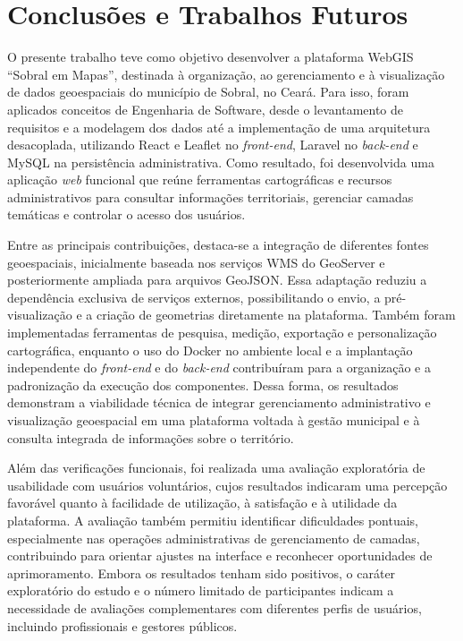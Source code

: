 
\chapter{Conclusões e Trabalhos Futuros}
\label{chap:conclusoes-e-trabalhos-futuros}

O presente trabalho teve como objetivo desenvolver a plataforma WebGIS ``Sobral em Mapas'', destinada à organização, ao gerenciamento e à visualização de dados geoespaciais do município de Sobral, no Ceará. Para isso, foram aplicados conceitos de Engenharia de Software, desde o levantamento de requisitos e a modelagem dos dados até a implementação de uma arquitetura desacoplada, utilizando React e Leaflet no \textit{front-end}, Laravel no \textit{back-end} e MySQL na persistência administrativa. Como resultado, foi desenvolvida uma aplicação \textit{web} funcional que reúne ferramentas cartográficas e recursos administrativos para consultar informações territoriais, gerenciar camadas temáticas e controlar o acesso dos usuários.

Entre as principais contribuições, destaca-se a integração de diferentes fontes geoespaciais, inicialmente baseada nos serviços WMS do GeoServer e posteriormente ampliada para arquivos GeoJSON. Essa adaptação reduziu a dependência exclusiva de serviços externos, possibilitando o envio, a pré-visualização e a criação de geometrias diretamente na plataforma. Também foram implementadas ferramentas de pesquisa, medição, exportação e personalização cartográfica, enquanto o uso do Docker no ambiente local e a implantação independente do \textit{front-end} e do \textit{back-end} contribuíram para a organização e a padronização da execução dos componentes. Dessa forma, os resultados demonstram a viabilidade técnica de integrar gerenciamento administrativo e visualização geoespacial em uma plataforma voltada à gestão municipal e à consulta integrada de informações sobre o território.

Além das verificações funcionais, foi realizada uma avaliação exploratória de usabilidade com usuários voluntários, cujos resultados indicaram uma percepção favorável quanto à facilidade de utilização, à satisfação e à utilidade da plataforma. A avaliação também permitiu identificar dificuldades pontuais, especialmente nas operações administrativas de gerenciamento de camadas, contribuindo para orientar ajustes na interface e reconhecer oportunidades de aprimoramento. Embora os resultados tenham sido positivos, o caráter exploratório do estudo e o número limitado de participantes indicam a necessidade de avaliações complementares com diferentes perfis de usuários, incluindo profissionais e gestores públicos.

